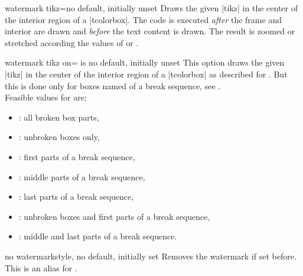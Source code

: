 \begin{docTcbKey}{watermark tikz}{=}{no default, initially unset}
Draws the given |tikz| 
in the center of the interior region of a |tcolorbox|.
The code is executed \emph{after} the
frame and interior are drawn and \emph{before} the text content is drawn.
The result is zoomed or stretched according the values of
 or .
\begin{dispExample}

\begin{tcolorbox}[enhanced,title=My title,
watermark tikz={\draw[line width=2mm] circle (1cm)
node{\fontfamily{ptm}\fontseries{b}\fontsize{20mm}{20mm}\selectfont ?};}]
\lipsum[1]
\tcblower
\lipsum[2]
\end{tcolorbox}
\end{dispExample}
\end{docTcbKey}



\begin{docTcbKey}{watermark tikz on}{= is }{no default, initially unset}
This option draws the given |tikz|  in the center of the interior region of a |tcolorbox|
as described for .
But this is done only for boxes named  of a break sequence, see
.\\ 
Feasible values for  are:
\begin{itemize}
\item{}: all broken box parts,
\item{}: unbroken boxes only,
\item{}: first parts of a break sequence,
\item{}: middle parts of a break sequence,
\item{}: last parts of a break sequence,
\item{}: unbroken boxes and first parts of a break sequence,
\item{}: middle and last parts of a break sequence.
\end{itemize}
\end{docTcbKey}


\begin{docTcbKey}{no watermark}{}{style, no default, initially set}
Removes the watermark if set before. This is an alias for
.
\end{docTcbKey}


